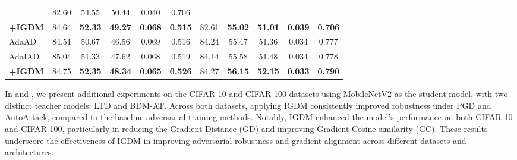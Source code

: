\documentclass{article} %
\begin{document}
\begin{table}[h]
\begin{tabular}{lcccccccccc}
& 82.60 & 54.55 & 50.44 & 0.040 & 0.706 
\\
 \textbf{+IGDM} & 84.64 & \textbf{52.33} & \textbf{49.27} & \textbf{0.068} & \textbf{0.515} 
& 82.61 & \textbf{55.02} & \textbf{51.01} & \textbf{0.039} & \textbf{0.706} 
\\
 \midrule
 AdaAD & 84.51& 50.67 & 46.56 & 0.069 & 0.516 
& 84.24 & 55.47& 51.36& 0.034 & 0.777 
\\
 AdaIAD & 85.04& 51.33& 47.62& 0.068& 0.519& 84.14& 55.58& 51.48& 0.034& 0.778\\
 \textbf{+IGDM} & 84.75& \textbf{52.35} & \textbf{48.34} & \textbf{0.065} & \textbf{0.526} & 84.27& \textbf{56.15} & \textbf{52.15} & \textbf{0.033} & \textbf{0.790} \\

\bottomrule
 \end{tabular}
 \label{tab:MNV2_cifar10}
\end{table}

In  and , we present additional experiments on the CIFAR-10 and CIFAR-100 datasets using MobileNetV2 \citep{sandler2018mobilenetv2} as the student model, with two distinct teacher models: LTD and BDM-AT. Across both datasets, applying IGDM consistently improved robustness under PGD and AutoAttack, compared to the baseline adversarial training methods. 
Notably, IGDM enhanced the model’s performance on both CIFAR-10 and CIFAR-100, particularly in reducing the Gradient Distance (GD) and improving Gradient Cosine similarity (GC). These results underscore the effectiveness of IGDM in improving adversarial robustness and gradient alignment across different datasets and architectures.
\end{document}
